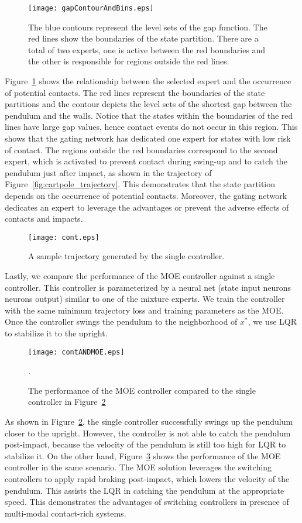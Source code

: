 \begin{figure}[tb]
    \centering
    \texttt{[image: gapContourAndBins.eps]}
    \caption{The blue contours represent the level sets of the gap function. The red lines show the boundaries of the state partition. There are a total of two experts, one is active between the red boundaries and the other is responsible for regions outside the red lines.}
    \label{fig:gapContour}
\end{figure}
Figure~\ref{fig:gapContour} shows the relationship between the selected expert
and the occurrence of potential contacts.
%
The red lines represent the boundaries of the state partitions and the contour
depicts the level sets of the shortest gap between the pendulum and the walls.
%
Notice that the states within the boundaries of the red lines have large gap
values, hence contact events do not occur in this region.
%
This shows that the gating network has dedicated one expert for states with low
risk of contact.
%
The regions outside the red boundaries correspond to the second expert, which is
activated to prevent contact during swing-up and to catch the pendulum just
after impact, as shown in the trajectory of
Figure~\ref{fig:cartpole_trajectory}.
%
This demonstrates that the state partition depends on the occurrence of
potential contacts.
%
Moreover, the gating network dedicates an expert to leverage the
advantages or prevent the adverse effects of contacts and impacts.
%

\begin{figure}[tb]
    \centering
    \texttt{[image: cont.eps]}
    \caption{A sample trajectory generated by the single controller. }
    \label{fig:continuous_control}
\end{figure}
%
Lastly, we compare the performance of the MOE controller against a single controller.
%
This controller is parameterized by a neural net (state input 
neurons  neurons  output) similar to one of the
mixture experts.
%
We train the controller with the same minimum trajectory loss and training
parameters as the MOE.
%
Once the controller swings the pendulum to the neighborhood of $x^*$, we use LQR
to stabilize it to the upright.
%
%
\begin{figure}[tb]
    \centering
    \texttt{[image: contANDMOE.eps]}
    \caption{The performance of the MOE controller compared to the single
    controller in Figure~\ref{fig:continuous_control}}.
    \label{fig:contandmoe}
\end{figure}
%
\noindent As shown in Figure~\ref{fig:continuous_control}, the single controller
successfully swings up the pendulum closer to the upright.
%
However, the controller is not able to catch the pendulum post-impact, because
the velocity of the pendulum is still too high for LQR to stabilize it.
%
On the other hand, Figure~\ref{fig:contandmoe} shows the performance of the MOE
controller in the same scenario.
%
The MOE solution leverages the switching controllers to apply rapid braking
post-impact, which lowers the velocity of the pendulum. 
%
This assists the LQR in catching the pendulum at the appropriate speed.
%
This demonstrates the advantages of switching controllers in presence of
multi-modal contact-rich systems.